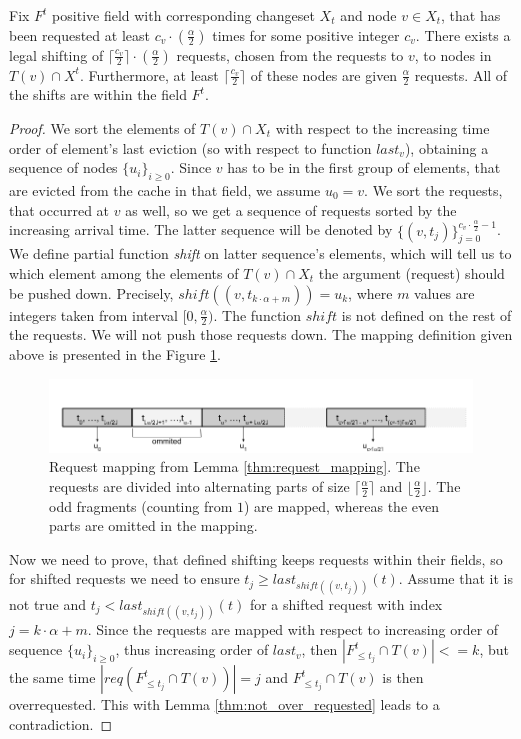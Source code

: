 \begin{lemma} Fix $F^t$ positive field with corresponding changeset $X_t$ and node $v \in X_t$,
that has been requested at least $c_v \cdot (\frac{\alpha}{2})$ times for some
positive integer $c_v$. There exists a legal shifting of $\lceil \frac{c_v}{2}
\rceil \cdot (\frac{\alpha}{2})$ requests, chosen from the requests to $v$, to nodes in $T(v) \cap X^t$.
Furthermore, at least $\lceil \frac{c_v}{2} \rceil$ of
these nodes are given $\frac{\alpha}{2}$ requests. All of the shifts are within
the field $F^t$.  \label{thm:request_mapping}
\end{lemma} 
\begin{proof} We sort
the elements of $T(v) \cap X_t$ with respect to the increasing time order of
element's last eviction (so with respect to function $last_v$), obtaining a sequence of nodes
$\{u_i\}_{i \geq 0}$. Since $v$ has to be in the first group of elements, that are
evicted from the cache in that field, we assume $u_0 = v$. We sort the
requests, that occurred at $v$ as well, so we get a sequence of requests sorted by the
increasing arrival time. The latter sequence will be denoted by $\{(v,
t_j)\}_{j=0}^{c_v \cdot \frac{\alpha}{2} - 1}$. We define partial function
\textit{shift} on latter sequence's elements, which will tell us to which element
among the elements of  $T(v) \cap X_t$ the argument (request) should be pushed
down. Precisely, $shift((v, t_{k \cdot \alpha + m})) = u_k$, where $m$ values are
integers taken from interval $[0, \frac{\alpha}{2})$. The function $shift$ is not
defined on the rest of the requests. We will not push those requests down. The
mapping definition given above is presented in the Figure \ref{fig:req_map}.
\begin{figure} \begin{center}
\includegraphics[width=1.1\textwidth]{request_mapping.png} \end{center}
\caption{Request mapping from Lemma \ref{thm:request_mapping}. The requests are
divided into alternating parts of size $\lceil \frac{\alpha}{2} \rceil$ and
$\lfloor \frac{\alpha}{2} \rfloor$. The odd fragments (counting from $1$) are
mapped, whereas the even parts are omitted in the mapping.} \label{fig:req_map}
\end{figure}

Now we need to prove, that defined shifting keeps requests within their fields,
so for shifted requests we need to ensure $t_j \geq last_{shift((v, t_j))}(t)$. Assume that
it is not true and $t_j < last_{shift((v, t_j))}(t)$ for a shifted request with index
$j = k \cdot \alpha + m$. Since the requests are mapped with respect to
increasing order of sequence $\{u_i\}_{i \geq 0}$, thus increasing order of $last_v$, then $|F^t_{\leq t_j} \cap T(v)| <= k$, but the
same time $|req(F^t_{\leq t_j} \cap T(v))| = j$ and $F^t_{\leq t_j} \cap T(v)$ is
then overrequested. This with Lemma \ref{thm:not_over_requested} leads to a
contradiction.
\end{proof}
